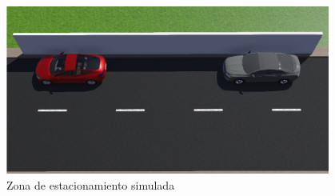 \documentclass[letterpaper,12pt]{article}
\begin{document}
\begin{figure}
  \centering
  \includegraphics[width=0.95\textwidth]{Figures/ParkingExample.png}
  \caption{Zona de estacionamiento simulada}
  \label{fig:Parking}
\end{figure}


\end{document}

